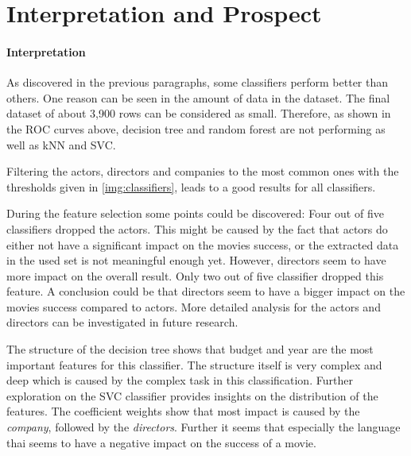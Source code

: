 \section{Interpretation and Prospect}
\paragraph{Interpretation}
As discovered in the previous paragraphs, some classifiers perform better than others. One reason can be seen in the amount of data in the dataset. The final dataset of about 3,900 rows can be considered as small. Therefore, as shown in the ROC curves above, decision tree and random forest are not performing as well as kNN and SVC. %

Filtering the actors, directors and companies to the most common ones with the thresholds given in \ref{img:classifiers}, leads to a good results for all classifiers.

During the feature selection some points could be discovered: Four out of five classifiers dropped the actors. 
This might be caused by the fact that actors do either not have a significant impact on the movies success, or the extracted data in the used set is not meaningful enough yet. 
However, directors seem to have more impact on the overall result. Only two out of five classifier dropped this feature. A conclusion could be that directors seem to have a bigger impact on the movies success compared to actors. 
More detailed analysis for the actors and directors can be investigated in future research.

The structure of the decision tree shows that budget and year are the most important features for this classifier. The structure itself is very complex and deep which is caused by the complex task in this classification. 
Further exploration on the SVC classifier provides insights on the distribution of the features. 
The coefficient weights show that most impact is caused by the \textit{company}, followed by the \textit{directors}. Further it seems that especially the language thai seems to have a negative impact on the success of a movie.

